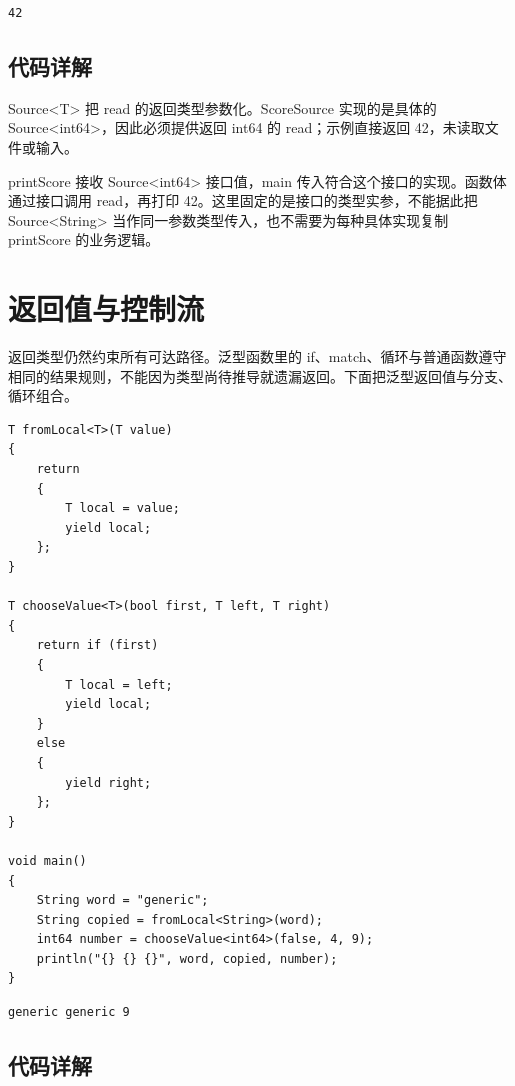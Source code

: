 \par
\medskip
\begin{lstlisting}[style=out]
42
\end{lstlisting}
\par
\medskip

\subsection*{代码详解}

Source<T> 把 read 的返回类型参数化。ScoreSource 实现的是具体的 Source<int64>，因此必须提供返回 int64 的 read；示例直接返回 42，未读取文件或输入。

printScore 接收 Source<int64> 接口值，main 传入符合这个接口的实现。函数体通过接口调用 read，再打印 42。这里固定的是接口的类型实参，不能据此把 Source<String> 当作同一参数类型传入，也不需要为每种具体实现复制 printScore 的业务逻辑。

\section{返回值与控制流}

返回类型仍然约束所有可达路径。泛型函数里的 if、match、循环与普通函数遵守相同的结果规则，不能因为类型尚待推导就遗漏返回。下面把泛型返回值与分支、循环组合。

\par
\medskip
\begin{lstlisting}[style=chali]
T fromLocal<T>(T value)
{
    return
    {
        T local = value;
        yield local;
    };
}

T chooseValue<T>(bool first, T left, T right)
{
    return if (first)
    {
        T local = left;
        yield local;
    }
    else
    {
        yield right;
    };
}

void main()
{
    String word = "generic";
    String copied = fromLocal<String>(word);
    int64 number = chooseValue<int64>(false, 4, 9);
    println("{} {} {}", word, copied, number);
}
\end{lstlisting}
\par
\medskip

\par
\medskip
\begin{lstlisting}[style=out]
generic generic 9
\end{lstlisting}
\par
\medskip

\subsection*{代码详解}

